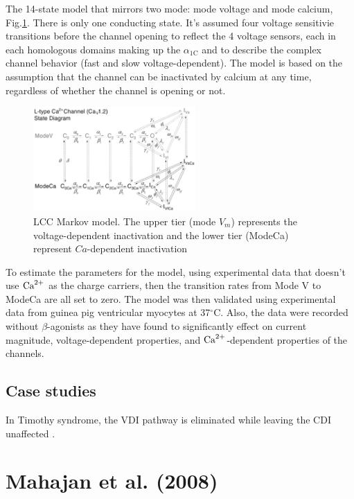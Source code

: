 The 14-state model that mirrors two mode: mode voltage and mode calcium,
Fig.\ref{fig:LCC_Faber2007}. There is only one conducting state. It's assumed
four voltage sensitivie transitions before the channel opening to reflect the 4
voltage sensors, each in each homologous domains making up the
$\alpha_\text{1C}$ and to describe the complex channel behavior (fast and slow
voltage-dependent). The model is based on the assumption that the channel can be
inactivated by calcium at any time, regardless of whether the channel is opening
or not.

\begin{figure}[hbt]
  \centerline{\includegraphics[height=4cm,
    angle=0]{./images/LCC_Faber2007.eps}}
\caption{LCC Markov model. The upper tier (mode $V_m$) represents the
voltage-dependent inactivation and the lower tier (ModeCa) represent
$Ca$-dependent inactivation}
\label{fig:LCC_Faber2007}
\end{figure}

To estimate the parameters for the model, using experimental data that doesn't
use ${\text{Ca}^{2+}}$ as the charge carriers, then the transition rates from Mode V to
ModeCa are all set to zero. The model was then validated using experimental data
from guinea pig ventricular myocytes at 37$^\circ$C. Also, the data were
recorded without $\beta$-agonists as they have found to significantly effect on
current magnitude, voltage-dependent properties, and ${\text{Ca}^{2+}}$-dependent properties
of the channels.



\subsection{Case studies}

In Timothy syndrome, the VDI pathway is eliminated while leaving the CDI
unaffected \citep{splawski2004, splawski2005}. 

\section{Mahajan et al. (2008)}
\label{sec:LCC_Mahajan2008}

